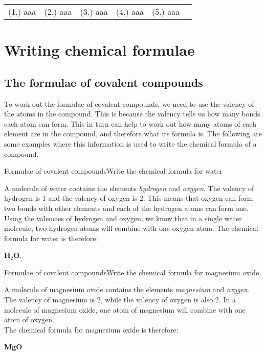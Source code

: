 {\begin{tabular}[h]{cccccc}
(1.) aaa & (2.) aaa & (3.) aaa & (4.) aaa & (5.) aaa & 
 \end{tabular}
}







\section{Writing chemical formulae}

\subsection{The formulae of covalent compounds}

To work out the formulae of covalent compounds, we need to use the valency of the atoms in the compound. This is because the valency tells us how many bonds each atom can form. This in turn can help to work out how many atoms of each element are in the compound, and therefore what its formula is. The following are some examples where this information is used to write the chemical formula of a compound.\\

\begin{wex}{Formulae of covalent compounds}{Write the chemical formula for water\\}
{
A molecule of water contains the elements \textit{hydrogen} and \textit{oxygen}.
The valency of hydrogen is 1 and the valency of oxygen is 2. This means that oxygen can form two bonds with other elements and each of the hydrogen atoms can form one.
Using the valencies of hydrogen and oxygen, we know that in a single water molecule, two hydrogen atoms will combine with one oxygen atom. The chemical formula for water is therefore:
\begin{center}
\textbf{H$_2$O}.
\end{center}}
\end{wex}

\begin{wex}{Formulae of covalent compounds}{Write the chemical formula for magnesium oxide\\}
{
A molecule of magnesium oxide contains the elements \textit{magnesium} and \textit{oxygen}.
The valency of magnesium is
2, while the valency of oxygen is also 2. In a molecule of magnesium oxide, one atom of magnesium will combine with one atom
of oxygen. \\
The chemical formula for magnesium oxide is therefore:

\begin{center}
\textbf{MgO}
\end{center}}
\end{wex}

